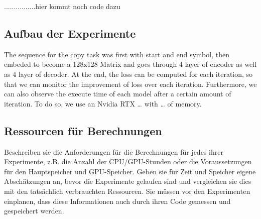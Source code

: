 \documentclass[DIV=13,fontsize=11pt]{scrartcl}
\begin{document}
................hier kommt noch code dazu


\subsection{Aufbau der Experimente}
The sequence for the copy task was first with start and end symbol, then embeded to become a 128x128 Matrix and goes through 4 layer of encoder as well as 4 layer of decoder. At the end, the loss can be computed for each iteration, so that we can monitor the improvement of loss over each iteration. Furthermore, we can also observe the execute time of each model after a certain amount of iteration. To do so, we use an Nvidia RTX … with … of memory.

\subsection{Ressourcen für Berechnungen}
Beschreiben sie die Anforderungen für die Berechnungen für jedes ihrer Experimente, z.B. die Anzahl der CPU/GPU-Stunden oder die Voraussetzungen für den Hauptspeicher und GPU-Speicher. 
Geben sie für Zeit und Speicher eigene Abschätzungen an, bevor die Experimente gelaufen sind und vergleichen sie dies mit den tatsächlich verbrauchten Ressourcen.
Sie müssen vor den Experimenten einplanen, dass diese Informationen auch durch ihren Code gemessen und gespeichert werden.

\end{document}
